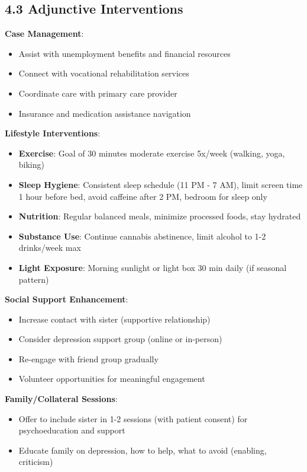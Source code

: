 \documentclass[11pt,letterpaper]{article}
\begin{document}
\subsection*{4.3 Adjunctive Interventions}

\textbf{Case Management}:
\begin{itemize}[leftmargin=*]
    \item Assist with unemployment benefits and financial resources
    \item Connect with vocational rehabilitation services
    \item Coordinate care with primary care provider
    \item Insurance and medication assistance navigation
\end{itemize}

\textbf{Lifestyle Interventions}:
\begin{itemize}[leftmargin=*]
    \item \textbf{Exercise}: Goal of 30 minutes moderate exercise 5x/week (walking, yoga, biking)
    \item \textbf{Sleep Hygiene}: Consistent sleep schedule (11 PM - 7 AM), limit screen time 1 hour before bed, avoid caffeine after 2 PM, bedroom for sleep only
    \item \textbf{Nutrition}: Regular balanced meals, minimize processed foods, stay hydrated
    \item \textbf{Substance Use}: Continue cannabis abstinence, limit alcohol to 1-2 drinks/week max
    \item \textbf{Light Exposure}: Morning sunlight or light box 30 min daily (if seasonal pattern)
\end{itemize}

\textbf{Social Support Enhancement}:
\begin{itemize}[leftmargin=*]
    \item Increase contact with sister (supportive relationship)
    \item Consider depression support group (online or in-person)
    \item Re-engage with friend group gradually
    \item Volunteer opportunities for meaningful engagement
\end{itemize}

\textbf{Family/Collateral Sessions}:
\begin{itemize}[leftmargin=*]
    \item Offer to include sister in 1-2 sessions (with patient consent) for psychoeducation and support
    \item Educate family on depression, how to help, what to avoid (enabling, criticism)
\end{itemize}
\end{document}

